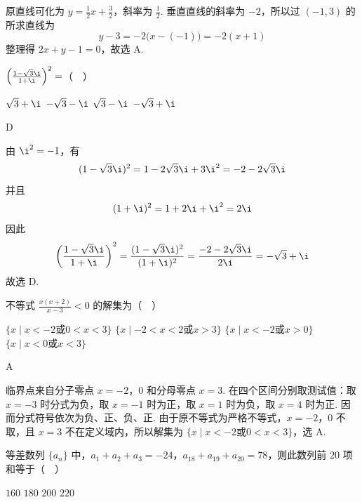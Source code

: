 \begin{solution}
原直线可化为 \(y=\frac12x+\frac32\)，斜率为 \(\frac12\). 垂直直线的斜率为 \(-2\)，所以过 \((-1,3)\) 的所求直线为
\[
y-3=-2\bigl(x-(-1)\bigr)=-2(x+1)
\]
整理得 \(2x+y-1=0\)，故选 A.
\end{solution}

\begin{problem}
\(\left(\frac{1 - \sqrt{3}\i}{1 + \i}\right)^2 =\)（\(\quad\)）

\choices
    {\(\sqrt{3} + \i\)}
    {\(-\sqrt{3} - \i\)}
    {\(\sqrt{3} - \i\)}
    {\(-\sqrt{3} + \i\)}
\end{problem}

\begin{answer}
D
\end{answer}

\begin{solution}
由 \(\i^2=-1\)，有
\[
(1-\sqrt3\i)^2=1-2\sqrt3\i+3\i^2=-2-2\sqrt3\i
\]
并且
\[
(1+\i)^2=1+2\i+\i^2=2\i
\]
因此
\[
\left(\frac{1-\sqrt{3}\i}{1+\i}\right)^2
=\frac{(1-\sqrt{3}\i)^2}{(1+\i)^2}
=\frac{-2-2\sqrt{3}\i}{2\i}
=-\sqrt{3}+\i
\]
故选 D.
\end{solution}

\begin{problem}
不等式 \(\frac{x\left(x + 2\right)}{x - 3} < 0\) 的解集为（\(\quad\)）

\choices
    {\(\{x \mid x < -2 \text{或} 0 < x < 3\}\)}
    {\(\{x \mid -2 < x < 2 \text{或} x > 3\}\)}
    {\(\{x \mid x < -2 \text{或} x > 0\}\)}
    {\(\{x \mid x < 0 \text{或} x < 3\}\)}
\end{problem}

\begin{answer}
A
\end{answer}

\begin{solution}
临界点来自分子零点 \(x=-2\)，\(0\) 和分母零点 \(x=3\). 在四个区间分别取测试值：取 \(x=-3\) 时分式为负，取 \(x=-1\) 时为正，取 \(x=1\) 时为负，取 \(x=4\) 时为正. 因而分式符号依次为负、正、负、正. 由于原不等式为严格不等式，\(x=-2\)，\(0\) 不取，且 \(x=3\) 不在定义域内，所以解集为 \(\{x\mid x<-2\text{或}0<x<3\}\)，选 A.
\end{solution}

\begin{problem}
等差数列 \(\{a_{n}\}\) 中，\(a_{1} + a_{2} + a_{3} = -24\)，\(a_{18} + a_{19} + a_{20} = 78\)，则此数列前 \(20\) 项和等于（\(\quad\)）

\choices
    {\(160\)}
    {\(180\)}
    {\(200\)}
    {\(220\)}
\end{problem}

